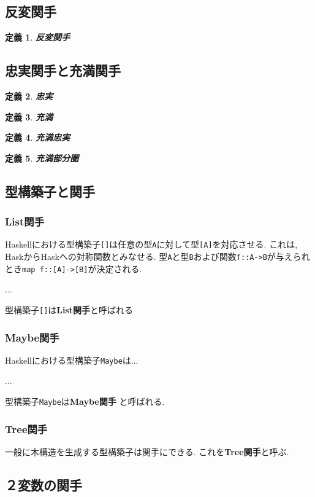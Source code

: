 \documentclass{jsbook}
\theoremstyle{plain}
\newtheorem{Def}{定義}[chapter]
\begin{document}
\subsection{反変関手}
\begin{Def}
{\bf 反変関手}
\end{Def}

\subsection{忠実関手と充満関手}
\begin{Def}
{\bf 忠実}
\end{Def}
\begin{Def}
{\bf 充満}
\end{Def}
\begin{Def}
{\bf 充満忠実}
\end{Def}
\begin{Def}
{\bf 充満部分圏}
\end{Def}

\subsection{型構築子と関手}
\subsubsection{List関手}
Haskellにおける型構築子\verb|[]|は任意の型\verb|A|に対して型\verb|[A]|を対応させる.
これは, HaskからHaskへの対称関数とみなせる.
型\verb|A|と型\verb|B|および関数\verb|f::A->B|が与えられとき\verb|map f::[A]->[B]|が決定される.

...

型構築子\verb|[]|は{\bf List関手}と呼ばれる
\subsubsection{Maybe関手}
Haskellにおける型構築子\verb|Maybe|は...

...

型構築子\verb|Maybe|は{\bf Maybe関手}
と呼ばれる.
\subsubsection{Tree関手}
一般に木構造を生成する型構築子は関手にできる. これを{\bf Tree関手}と呼ぶ.


\subsection{２変数の関手}
\end{document}
